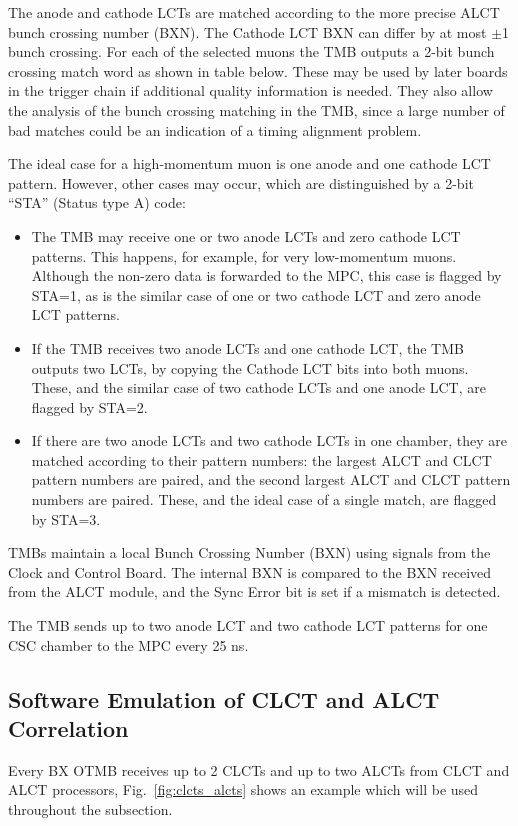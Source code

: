 The anode and cathode LCTs are matched according to the more precise ALCT bunch
crossing number (BXN). The Cathode LCT BXN can differ by at most $\pm$1 bunch crossing. For each
of the selected muons the TMB outputs a 2-bit bunch crossing match word as shown in
table below. These may be used by later boards in the trigger chain if additional quality information
is needed. They also allow the analysis of the bunch crossing matching in the TMB, since a large
number of bad matches could be an indication of a timing alignment problem.

The ideal case for a high-momentum muon is one anode and one cathode LCT pattern.
However, other cases may occur, which are distinguished by a 2-bit “STA” (Status type A) code:

\begin{itemize}
	\item The TMB may receive one or two anode LCTs and zero cathode LCT patterns. This
happens, for example, for very low-momentum muons. Although the non-zero data is
forwarded to the MPC, this case is flagged by STA=1, as is the similar case of one or two
cathode LCT and zero anode LCT patterns.
	\item If the TMB receives two anode LCTs and one cathode LCT, the TMB outputs two LCTs,
by copying the Cathode LCT bits into both muons. These, and the similar case of two
cathode LCTs and one anode LCT, are flagged by STA=2.
	\item If there are two anode LCTs and two cathode LCTs in one chamber, they are matched
according to their pattern numbers: the largest ALCT and CLCT pattern numbers are
paired, and the second largest ALCT and CLCT pattern numbers are paired. These, and
the ideal case of a single match, are flagged by STA=3.
\end{itemize}

TMBs maintain a local Bunch Crossing Number (BXN) using signals from the Clock
and Control Board. The internal BXN is compared to the BXN received from the ALCT module,
and the Sync Error bit is set if a mismatch is detected.

The TMB sends up to two anode LCT and two cathode LCT patterns for one CSC
chamber to the MPC every 25 ns.

\newpage
\subsection{Software Emulation of CLCT and ALCT Correlation}

Every BX OTMB receives up to 2 CLCTs and up to two ALCTs from CLCT and ALCT processors, Fig.~\ref{fig:clcts_alcts} shows an example which will be used throughout the subsection.

